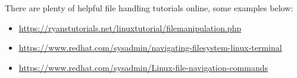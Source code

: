 \documentclass{article}
\begin{document}
There are plenty of helpful file handling tutorials online, some examples
below:
\begin{itemize}
\item \url{https://ryanstutorials.net/linuxtutorial/filemanipulation.php}
\item \url{https://www.redhat.com/sysadmin/navigating-filesystem-linux-terminal}
\item \url{https://www.redhat.com/sysadmin/Linux-file-navigation-commands}
\end{itemize}
  
  
\end{document}
